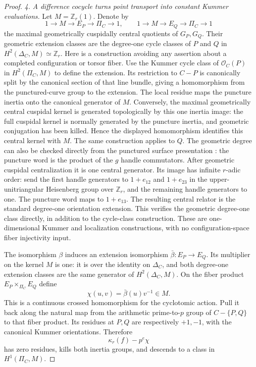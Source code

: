 \begin{proof}
\emph{4. A difference cocycle turns point transport
into constant Kummer evaluations.}
Let \(M=\mathbb Z_r(1)\). Denote by
\[
  1\longrightarrow M\longrightarrow E_P
     \longrightarrow\Pi_C\longrightarrow1,
  \qquad
  1\longrightarrow M\longrightarrow E_Q
     \longrightarrow\Pi_C\longrightarrow1
                                                        \tag{AG.40.2}
\]
the maximal geometrically cuspidally central
quotients of \(G_P,G_Q\). Their geometric
extension classes are the degree-one cycle classes
of \(P\) and \(Q\) in
\(H^2(\Delta_C,M)\simeq\mathbb Z_r\).
Here is a construction avoiding any assertion
about a completed configuration or torsor fiber.
Use the Kummer cycle class of
\(\mathcal O_C(P)\) in
\(H^2(\Pi_C,M)\) to define the extension.
Its restriction to \(C-P\) is canonically
split by the canonical section of that line
bundle, giving a homomorphism from the
punctured-curve group to the extension.
The local residue maps the puncture inertia
onto the canonical generator of \(M\).
Conversely, the maximal geometrically central
cuspidal kernel is generated topologically by
this one inertia image: the full cuspidal
kernel is normally generated by the puncture
inertia, and geometric conjugation has been
killed. Hence the displayed homomorphism
identifies this central kernel with \(M\).
The same construction applies to \(Q\).
The geometric degree can also be checked directly
from the punctured surface presentation
\cite[XIII, Corollary~2.12]{AR_SGA1}: the puncture
word is the product of the \(g\) handle commutators.
After geometric cuspidal centralization it is one central
generator. Its image has infinite \(r\)-adic order:
send the first handle generators to \(1+e_{12}\)
and \(1+e_{23}\) in the upper-unitriangular
Heisenberg group over \(\mathbb Z_r\), and the
remaining handle generators to one. The puncture word
maps to \(1+e_{13}\). The resulting central relator
is the standard degree-one orientation extension.
This verifies the geometric degree-one class directly,
in addition to the cycle-class construction.
These are one-dimensional Kummer and localization
constructions, with no configuration-space fiber
injectivity input.

The isomorphism \(\beta\) induces an extension
isomorphism \(\bar\beta:E_P\to E_Q\).
Its multiplier on the kernel \(M\) is one:
it is over the identity on \(\Delta_C\), and
both degree-one extension classes are the same
generator of \(H^2(\Delta_C,M)\).
On the fiber product \(E_P\times_{\Pi_C}E_Q\)
define
\[
                 \chi(u,v)=\bar\beta(u)v^{-1}\in M.
                                                        \tag{AG.40.3}
\]
This is a continuous crossed homomorphism for the
cyclotomic action. Pull it back along the natural
map from the arithmetic prime-to-\(p\) group of
\(C-\{P,Q\}\) to that fiber product. Its residues
at \(P,Q\) are respectively \(+1,-1\), with
the canonical Kummer orientations. Therefore
\[
                         \kappa_r(f)-p^e\chi
                                                        \tag{AG.40.4}
\]
has zero residues, kills both inertia groups, and
descends to a class in \(H^1(\Pi_C,M)\).


\end{proof}
